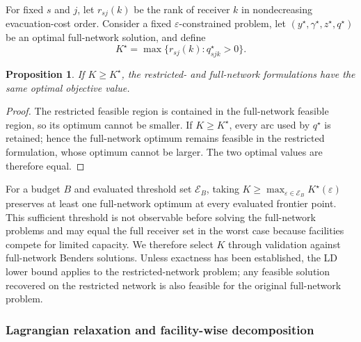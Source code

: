 \documentclass[preprint,11pt,authoryear]{elsarticle}
\newtheorem{proposition}{Proposition}
\begin{document}
For fixed \(s\) and \(j\), let \(r_{sj}(k)\) be the rank of receiver \(k\)
in nondecreasing evacuation-cost order. Consider a fixed
\(\varepsilon\)-constrained problem, let
\((y^\star,\gamma^\star,z^\star,q^\star)\) be an optimal full-network
solution, and define
\begin{equation}
K^\star=\max\{r_{sj}(k):q_{sjk}^\star>0\}.
\label{eq:kstar}
\end{equation}

\begin{proposition}
If \(K\geq K^\star\), the restricted- and full-network formulations have the
same optimal objective value.
\end{proposition}

\begin{proof}
The restricted feasible region is contained in the full-network feasible
region, so its optimum cannot be smaller. If \(K\geq K^\star\), every arc used
by \(q^\star\) is retained; hence the full-network optimum remains feasible in
the restricted formulation, whose optimum cannot be larger. The two optimal
values are therefore equal.
\end{proof}

For a budget \(B\) and evaluated threshold set \(\mathcal E_B\), taking
\(K\geq\max_{\varepsilon\in\mathcal E_B}K^\star(\varepsilon)\) preserves at
least one full-network optimum at every evaluated frontier point. This
sufficient threshold is not observable before solving the full-network
problems and may equal the full receiver set in the worst case because
facilities compete for limited capacity. We therefore select \(K\) through
validation against full-network Benders solutions. Unless exactness has been
established, the LD lower bound applies to the restricted-network problem;
any feasible solution recovered on the restricted network is also feasible
for the original full-network problem.

\subsubsection{Lagrangian relaxation and facility-wise decomposition}
\label{sec:ld_relaxation}
\end{document}
